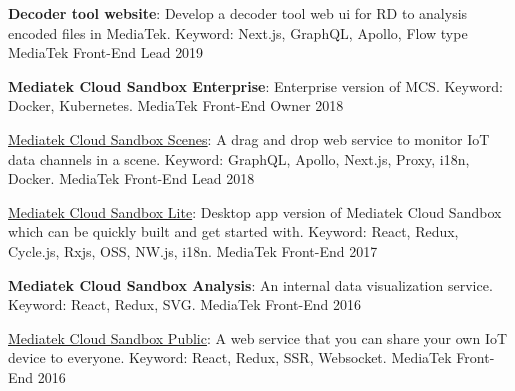 \begin{cvhonors}
  \cvhonor
    {\textbf{Decoder tool website}: \textmd{Develop a decoder tool web ui for RD to analysis encoded files in MediaTek. Keyword: Next.js, GraphQL, Apollo, Flow type}} %
    {MediaTek} %
    {Front-End Lead} %
    {2019} %

  \cvhonor
    {\textbf{Mediatek Cloud Sandbox Enterprise}: \textmd{Enterprise version of MCS. Keyword: Docker, Kubernetes.}} %
    {MediaTek} %
    {Front-End Owner} %
    {2018} %

  \cvhonor
    {\href{https://medium.com/mediatekcloudsandbox/\%E5\%A6\%82\%E4\%BD\%95\%E9\%80\%8F\%E9\%81\%8E-scene-\%E5\%A0\%B4\%E6\%99\%AF-\%E5\%8A\%9F\%E8\%83\%BD\%E5\%BF\%AB\%E9\%80\%9F\%E6\%89\%93\%E9\%80\%A0\%E7\%89\%A9\%E8\%81\%AF\%E7\%B6\%B2\%E6\%87\%89\%E7\%94\%A8-1-d10d0d687742}{Mediatek Cloud Sandbox Scenes}: \textmd{A drag and drop web service to monitor IoT data channels in a scene. Keyword: GraphQL, Apollo, Next.js, Proxy, i18n, Docker.}} %
    {MediaTek} %
    {Front-End Lead} %
    {2018} %

  \cvhonor
    {\href{https://mcslite.netlify.com/}{Mediatek Cloud Sandbox Lite}: \textmd{Desktop app version of Mediatek Cloud Sandbox which can be quickly built and get started with. Keyword: React, Redux, Cycle.js, Rxjs, OSS, NW.js, i18n.}} %
    {MediaTek} %
    {Front-End} %
    {2017} %

  \cvhonor
    {\textbf{Mediatek Cloud Sandbox Analysis}: \textmd{An internal data visualization service. Keyword: React, Redux, SVG.}} %
    {MediaTek} %
    {Front-End} %
    {2016} %

  \cvhonor
    {\href{https://medium.com/mediatekcloudsandbox/\%E5\%B0\%87\%E6\%82\%A8\%E7\%9A\%84\%E8\%A3\%9D\%E7\%BD\%AE\%E8\%A8\%AD\%E7\%82\%BA\%E5\%85\%AC\%E9\%96\%8B\%E4\%B8\%A6\%E5\%88\%86\%E4\%BA\%AB\%E7\%B5\%A6\%E4\%BB\%BB\%E4\%BD\%95\%E4\%BA\%BA\%E7\%80\%8F\%E8\%A6\%BD-a96d47ba5859}{Mediatek Cloud Sandbox Public}: \textmd{A web service that you can share your own IoT device to everyone. Keyword: React, Redux, SSR, Websocket.}} %
    {MediaTek} %
    {Front-End} %
    {2016} %


\end{cvhonors}
